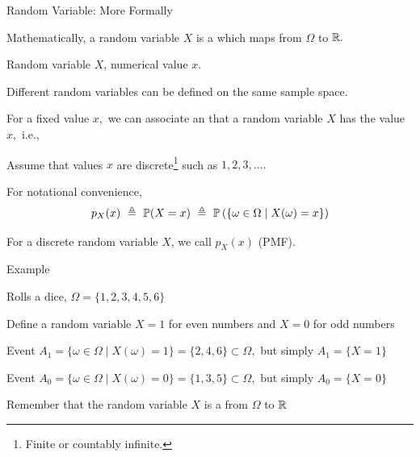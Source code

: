 \begin{frame}{Random Variable: More Formally}

\plitemsep 0.1in

\bci 
\item<2-> Mathematically, a random variable $X$ is a  which maps from $\Omega$ to ${\mathbb R}.$

\item<4->  Random variable $X$, numerical value $x.$

\item<5-> Different random variables can be defined on the same sample space. 

\item<6-> For a fixed value $x,$ we can associate an  that a random variable $X$ has the value $x,$ i.e., 

\item<8-> Assume that values $x$ are discrete\footnote{Finite or countably infinite.} such as $1, 2, 3, \ldots.$

For notational convenience,  
$$
p_X(x) \ \eqdef \ \cprob{X = x} \ \eqdef \ \cbprob{\{ \omega \in \Omega \mid X(\omega) = x \}} 
$$

\item<9-> For a discrete random variable $X$, we call $p_X(x)$  (PMF).

\eci 

\end{frame}

\begin{frame}{Example}

\plitemsep 0.1in

\bci 
\item Rolls a dice, $\Omega = \{1, 2,3, 4, 5, 6 \}$
\item Define a random variable $X = 1$ for even numbers and $X=0$ for odd numbers
\item Event $A_1 = \{\omega \in \Omega \mid  X(\omega) = 1 \} = \{2,4,6 \} \subset \Omega,$ but simply $A_1 = \{X =1\}$

\item Event $A_0 = \{\omega \in \Omega \mid  X(\omega) = 0 \} = \{1,3,5 \} \subset \Omega,$ but simply $A_0 = \{X =0\}$

\bigskip
\item Remember that the random variable $X$ is a  from $\Omega$ to ${\mathbb R}$
\eci 

\end{frame}

